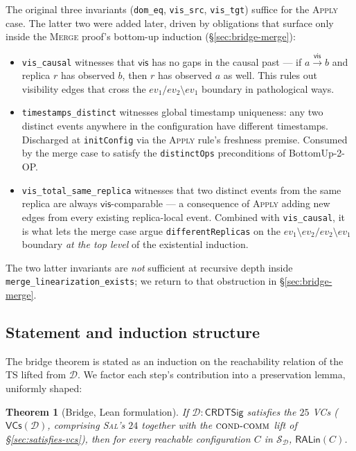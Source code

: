\documentclass[11pt,a4paper]{article}
\newtheorem{theorem}{Theorem}[section]
\theoremstyle{definition}
\theoremstyle{remark}
\newcommand{\RDT}{\ensuremath{\mathcal{D}}}
\newcommand{\mvis}{\mathsf{vis}}
\newcommand{\ev}{\mathit{ev}}
\newcommand{\RALin}{\mathsf{RALin}}
\newcommand{\VCs}{\mathsf{VCs}}
\newcommand{\Sal}{\textsc{Sal}}
\begin{document}
The original three invariants (\texttt{dom\_eq}, \texttt{vis\_src},
\texttt{vis\_tgt}) suffice for the \textsc{Apply} case. The latter two
were added later, driven by obligations that surface only inside the
\textsc{Merge} proof's bottom-up induction
(\S\ref{sec:bridge-merge}):
\begin{itemize}[leftmargin=*]
  \item \texttt{vis\_causal} witnesses that $\mvis$ has no gaps in the
    causal past --- if $a \xrightarrow{\mvis} b$ and replica $r$ has
    observed $b$, then $r$ has observed $a$ as well. This rules out
    visibility edges that cross the
    $\ev_1 / \ev_2 \setminus \ev_1$ boundary in pathological ways.
  \item \texttt{timestamps\_distinct} witnesses global timestamp
    uniqueness: any two distinct events anywhere in the configuration
    have different timestamps. Discharged at \texttt{initConfig} via
    the \textsc{Apply} rule's freshness premise. Consumed by the merge
    case to satisfy the \texttt{distinctOps} preconditions of
    BottomUp-2-OP.
  \item \texttt{vis\_total\_same\_replica} witnesses that two distinct
    events from the same replica are always $\mvis$-comparable --- a
    consequence of \textsc{Apply} adding new edges from every
    existing replica-local event. Combined with \texttt{vis\_causal},
    it is what lets the merge case argue \texttt{differentReplicas}
    on the $\ev_1 \setminus \ev_2 / \ev_2 \setminus \ev_1$ boundary
    \emph{at the top level} of the existential induction.
\end{itemize}
The two latter invariants are \emph{not} sufficient at recursive depth
inside \texttt{merge\_linearization\_exists}; we return to that
obstruction in \S\ref{sec:bridge-merge}.

\subsection{Statement and induction structure}
\label{sec:bridge-statement}

The bridge theorem is stated as an induction on the reachability
relation of the TS lifted from $\RDT$. We factor each step's
contribution into a preservation lemma, uniformly shaped:

\begin{theorem}[Bridge, Lean formulation]
\label{thm:bridge-lean}
If $\RDT : \mathsf{CRDTSig}$ satisfies the $25$ VCs
($\VCs(\RDT)$, comprising \Sal{}'s $24$ together with the
$\textsc{cond-comm}$ lift of \S\ref{sec:satisfies-vcs}), then for
every reachable configuration $C$ in $\mathcal{S}_\RDT$,
$\RALin(C)$.
\end{theorem}
\end{document}
